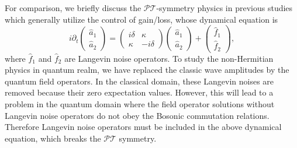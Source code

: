 \documentclass[twocolumn,prl,floatfix,citeautoscript,nofootinbib,superscriptaddress]{revtex4}
\begin{document}
\begin{widetext}
For comparison, we briefly discuss the $\mathcal{PT}$-symmetry physics in
previous studies which generally utilize the control of gain/loss, whose
dynamical equation is
\begin{equation}
i\partial _{t}\left(
\begin{array}{c}
\hat{a}_{1} \\
\hat{a}_{2}%
\end{array}%
\right) =\left(
\begin{array}{cc}
i\delta & \kappa \\
\kappa & -i\delta%
\end{array}%
\right) \left(
\begin{array}{c}
\hat{a}_{1} \\
\hat{a}_{2}%
\end{array}%
\right) +\left(
\begin{array}{c}
\hat{f}_{1} \\
\hat{f}_{2}%
\end{array}%
\right) ,  \label{eq:bdg2SS}
\end{equation}%
where $\hat{f}_{1}$ and $\hat{f}_{2}$ are Langevin noise operators. To study
the non-Hermitian physics in quantum realm, we have replaced the classic
wave amplitudes by the quantum field operators. In the classical domain,
these Langevin noises are removed because their zero expectation values.
However, this will lead to a problem in the quantum domain where the field
operator solutions without Langevin noise operators do not obey the Bosonic
commutation relations. Therefore Langevin noise operators must be included
in the above dynamical equation, which breaks the $\mathcal{PT}$ symmetry.


\end{widetext}
\end{document}
